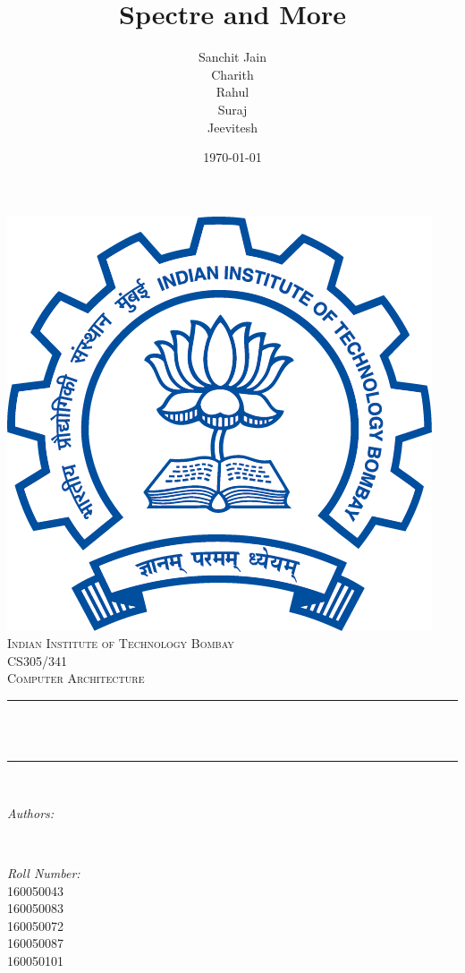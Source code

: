 \documentclass[12pt]{article}
\title{Spectre and More}								%
\author{Sanchit Jain\\ Charith \\Rahul\\Suraj\\ Jeevitesh}								%
\date{\today}											%
\makeatletter
\let\thetitle\@title
\let\theauthor\@author
\let\thedate\@date
\makeatother
\begin{document}

\begin{titlepage}
	\centering
    \vspace*{0.5 cm}
    \includegraphics[scale = 0.25]{logo.png}\\[1.0 cm]	%
    \textsc{\LARGE Indian Institute of Technology Bombay}\\[2.0 cm]	%
	\textsc{\Large CS305/341}\\[0.5 cm]				%
	\textsc{\large  Computer Architecture}\\[0.5 cm]				%
	\rule{\linewidth}{0.2 mm} \\[0.4 cm]
	{ \huge \bfseries \thetitle}\\
	\rule{\linewidth}{0.2 mm} \\[1.5 cm]
	
	\begin{minipage}{0.4\textwidth}
		\begin{flushleft} \large
			\emph{Authors:}\\
			\theauthor
			\end{flushleft}
			\end{minipage}~
			\begin{minipage}{0.4\textwidth}
			\begin{flushright} \large
			\emph{Roll Number:} \\
			160050043\\
			160050083\\
			160050072\\
			160050087\\
			160050101\\%
		\end{flushright}
	\end{minipage}\\[2 cm]
	
	{\large \thedate}\\[2 cm]
 
	\vfill
	
\end{titlepage}
\end{document}
